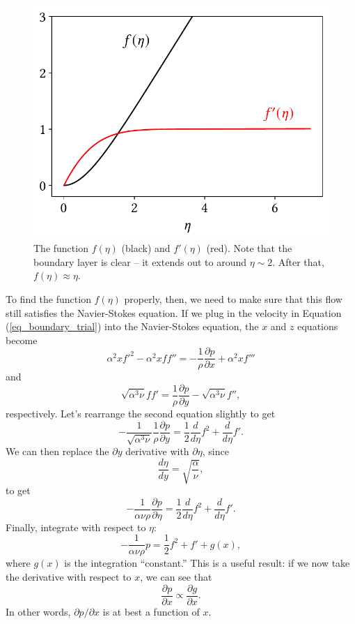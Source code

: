 \begin{figure}
\centering
\includegraphics[width=0.7\linewidth]{Figures/Chapter6/fig_boundary_result1}
\caption{The function $f(\eta)$ (black) and $f'(\eta)$ (red).  Note that the boundary layer is clear -- it extends out to around $\eta \sim 2$.  After that, $f(\eta) \approx \eta$. }
\label{fig_boundary_result1}
\end{figure}

To find the function $f(\eta)$ properly, then, we need to make sure that this flow still satisfies the Navier-Stokes equation.  If we plug in the velocity in Equation (\ref{eq_boundary_trial}) into the Navier-Stokes equation, the $x$ and $z$ equations become
\begin{equation}
\label{eq_boundary_ns1}
\alpha^2 x f'^2 - \alpha^2 x f f'' = -\frac{1}{\rho} \frac{\partial p}{\partial x} + \alpha^2 x f'''
\end{equation}
and
\begin{equation}
\sqrt{\alpha^3 \nu } ff' = \frac{1}{\rho} \frac{\partial p}{\partial y} - \sqrt{\alpha^3 \nu} f'',
\end{equation}
respectively.  Let's rearrange the second equation slightly to get
\[
-\frac{1}{\sqrt{\alpha^3 \nu}} \frac{1}{\rho} \frac{\partial p}{\partial y} = \frac{1}{2} \frac{d}{d\eta} f^2 + \frac{d}{d\eta} f'.
\]
We can then replace the $\partial y$ derivative with $\partial \eta$, since
\[
\frac{d\eta}{dy} = \sqrt{\frac{\alpha}{\nu}},
\]
to get
\[
-\frac{1}{\alpha \nu \rho} \frac{\partial p}{\partial \eta} = \frac{1}{2} \frac{d}{d\eta} f^2 + \frac{d}{d\eta} f'.
\]
Finally, integrate with respect to $\eta$:
\[
-\frac{1}{\alpha \nu \rho} p = \frac{1}{2} f^2 + f' + g(x),
\]
where $g(x)$ is the integration ``constant.''  This is a useful result:  if we now take the derivative with respect to $x$, we can see that 
\[
\frac{\partial p}{\partial x} \propto \frac{\partial g}{\partial x}.
\]
In other words, $\partial p / \partial x$ is at best a function of $x$.

